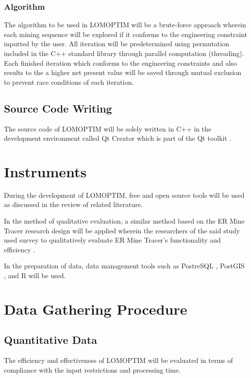 \documentclass[12pt]{report}
\begin{document}
\subsubsection{Algorithm}

The algorithm to be used in LOMOPTIM will be a brute-force approach wherein each mining sequence will be explored if it conforms to the engineering constraint inputted by the user.
All iteration will be predetermined using permutation included in the C++ standard library through parallel computation (threading).
Each finished iteration which conforms to the engineering constraints and also results to the a higher net present value will be saved through mutual exclusion to prevent race conditions of each iteration.


\subsection{Source Code Writing}

The source code of LOMOPTIM will be solely written in C++ \cite{cpp} in the development environment called Qt Creator which is part of the Qt toolkit \cite{qt}.

\section{Instruments}

During the development of LOMOPTIM, free and open source tools will be used as discussed in the review of related literature.

In the method of qualitative evaluation, a similar method based on the ER Mine Tracer research design will be applied wherein the researchers of the said study used survey to qualitatively evaluate ER Mine Tracer's functionality and efficiency \cite{ERMineTracer}.

In the preparation of data, data management tools such as PostreSQL \cite{postgres}, PostGIS \cite{postgis}, and R \cite{R} will be used.

\section{Data Gathering Procedure}

\subsection{Quantitative Data}

The efficiency and effectiveness of LOMOPTIM will be evaluated in terms of compliance with the input restrictions and processing time.
\end{document}

